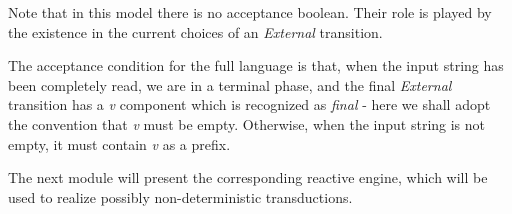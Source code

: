 Note that in this model there is no acceptance boolean. Their role is played by the existence
in the current choices of an {\sl External} transition.

The acceptance condition for the full language is that, when the input string has been 
completely read, we are in a terminal phase, and the final {\sl External} transition has
a {\sl v} component which is recognized as {\sl final} - here we shall adopt the convention
that {\sl v} must be empty. Otherwise, when the input string is not empty, it must
contain {\sl v} as a prefix. 

The next module will present the corresponding reactive engine,
which will be used to realize possibly non-deterministic transductions.

